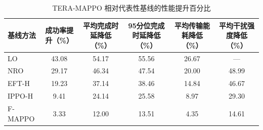 \begin{table}[htbp]
\centering
\caption{TERA-MAPPO 相对代表性基线的性能提升百分比}
\label{tab:tera_mappo_improvement}
\begin{tabular}{lccccc}
\toprule
基线方法 & 成功率提升（\%） & 平均完成时延降低（\%） & 95分位完成时延降低（\%） & 平均传输能耗降低（\%） & 平均干扰强度降低（\%） \\
\midrule
LO & 43.08 & 54.17 & 55.56 & 26.67 & --- \\
NRO & 29.17 & 46.34 & 47.54 & 20.00 & 48.99 \\
EFT-H & 19.23 & 37.14 & 38.46 & 14.84 & 46.67 \\
IPPO-H & 9.41 & 24.14 & 25.58 & 8.97 & 29.30 \\
F-MAPPO & 3.33 & 12.00 & 13.51 & 4.35 & 14.61 \\
\bottomrule
\end{tabular}
\end{table}
